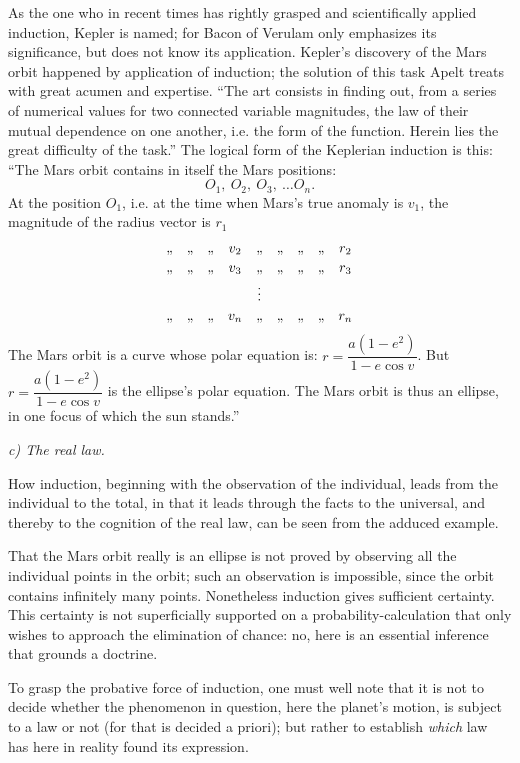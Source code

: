 \documentclass[12pt]{book}
\begin{document}
As the one who in recent times has rightly grasped and scientifically applied
induction, Kepler is named; for Bacon of Verulam only emphasizes its significance,
but does not know its application. Kepler's discovery of the Mars orbit happened by
application of induction; the solution of this task Apelt treats with great acumen
and expertise. ``The art consists in finding out, from a series of numerical values
for two connected variable magnitudes, the law of their mutual dependence on one
another, i.e. the form of the function. Herein lies the great difficulty of the
task.''
The logical form of the Keplerian induction is this: ``The Mars orbit contains in
itself the Mars positions:
\[ O_1,\ O_2,\ O_3,\ \ldots O_n. \]
At the position $O_1$, i.e. at the time when Mars's true anomaly is $v_1$, the
magnitude of the radius vector is $r_1$
\[
\begin{array}{ccccccccc}
\text{,,}&\text{,,}&\text{,,}& v_2 &\text{,,}&\text{,,}&\text{,,}&\text{,,}& r_2\\[2pt]
\text{,,}&\text{,,}&\text{,,}& v_3 &\text{,,}&\text{,,}&\text{,,}&\text{,,}& r_3\\[2pt]
\multicolumn{9}{c}{\vdots}\\[2pt]
\text{,,}&\text{,,}&\text{,,}& v_n &\text{,,}&\text{,,}&\text{,,}&\text{,,}& r_n\\
\end{array}
\]
The Mars orbit is a curve whose polar equation is: $r = \dfrac{a(1-e^2)}{1-e\cos
v}$. But $r = \dfrac{a(1-e^2)}{1-e\cos v}$ is the ellipse's polar equation. The Mars
orbit is thus an ellipse, in one focus of which the sun stands.''

\emph{c) The real law.}

How induction, beginning with the observation of the individual, leads from the
individual to the total, in that it leads through the facts to the universal, and
thereby to the cognition of the real law, can be seen from the adduced example.

That the Mars orbit really is an ellipse is not proved by observing all the
individual points in the orbit; such an observation is impossible, since the orbit
contains infinitely many points. Nonetheless induction gives sufficient certainty.
This certainty is not superficially supported on a probability-calculation that
only wishes to approach the elimination of chance: no, here is an essential
inference that grounds a doctrine.

To grasp the probative force of induction, one must well note that it is not to
decide whether the phenomenon in question, here the planet's motion, is subject
to a law or not (for that is decided a priori); but rather to establish
\emph{which} law has here in reality found its expression.
\end{document}
